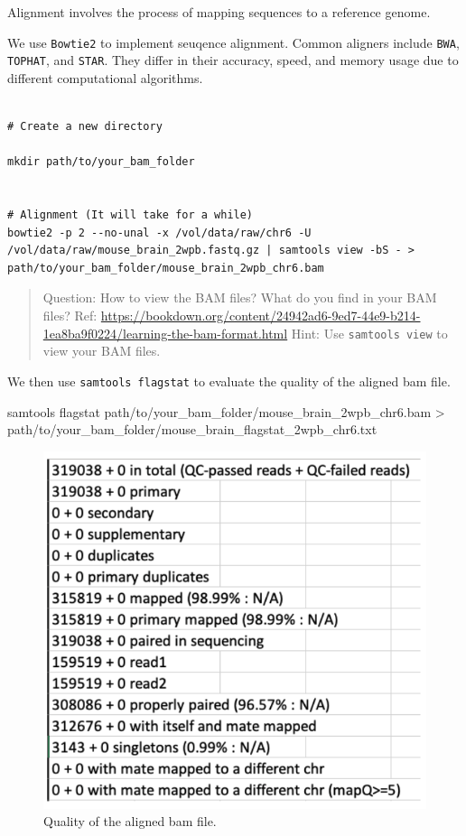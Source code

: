 \documentclass[
]{book}
\newenvironment{Shaded}{\begin{snugshade}}{\end{snugshade}}
\newcommand{\NormalTok}[1]{#1}
\begin{document}
Alignment involves the process of mapping sequences to a reference genome.

We use \texttt{Bowtie2} to implement seuqence alignment. Common aligners include \texttt{BWA}, \texttt{TOPHAT}, and \texttt{STAR}. They differ in their accuracy, speed, and memory usage due to different computational algorithms.

\begin{verbatim}

# Create a new directory

mkdir path/to/your_bam_folder


# Alignment (It will take for a while)
bowtie2 -p 2 --no-unal -x /vol/data/raw/chr6 -U /vol/data/raw/mouse_brain_2wpb.fastq.gz | samtools view -bS - > path/to/your_bam_folder/mouse_brain_2wpb_chr6.bam 

\end{verbatim}

\begin{quote}
Question: How to view the BAM files? What do you find in your BAM files?
Ref: \url{https://bookdown.org/content/24942ad6-9ed7-44e9-b214-1ea8ba9f0224/learning-the-bam-format.html}
Hint: Use \texttt{samtools\ view} to view your BAM files.
\end{quote}

We then use \texttt{samtools\ flagstat} to evaluate the quality of the aligned bam file.

\begin{Shaded}
\begin{Highlighting}[]
\NormalTok{samtools flagstat path/to/your\_bam\_folder/mouse\_brain\_2wpb\_chr6.bam  \textgreater{} path/to/your\_bam\_folder/mouse\_brain\_flagstat\_2wpb\_chr6.txt}
\end{Highlighting}
\end{Shaded}

\begin{figure}
\centering
\includegraphics{figures/flagstat.png}
\caption{Quality of the aligned bam file.}
\end{figure}
\end{document}
